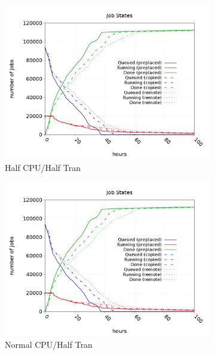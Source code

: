 \documentclass[a4paper]{jpconf}
\begin{document}
\begin{figure}
  \centering
  \begin{subfigure}{0.3\textwidth}
    \includegraphics[width=\textwidth]{figures/FM1_RM1CPU.png}
    \caption{Half CPU/Half Tran}
  \end{subfigure}
  \begin{subfigure}{0.3\textwidth}
    \includegraphics[width=\textwidth]{figures/FM1_RP0CPU.png}
    \caption{Normal CPU/Half Tran}
  \end{subfigure}
  \begin{subfigure}{0.3\textwidth}

\end{subfigure}
\end{figure}
\end{document}
